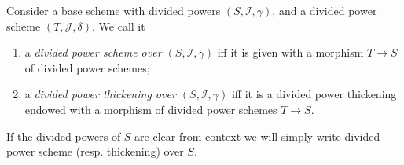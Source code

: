 \begin{defn}
	Consider a base scheme with divided powers
	$\left(S, \mathcal{I}, \gamma\right)$, and a divided power
	scheme $\left(T, \mathcal{J}, \delta\right)$.
	We call it 
\begin{enumerate}
	\item a \emph{divided power scheme over $\left(S, \mathcal{I}, \gamma\right)$}
		iff it is given with a morphism 
		$T \to S$
		of divided power schemes;

	\item a \emph{divided power thickening over $\left(S, \mathcal{I}, \gamma\right)$}
		iff it is a divided power thickening endowed
		with a morphism of divided power schemes $T \to S$.
\end{enumerate}
	If the divided powers of $S$ are clear from context we will
	simply write divided power scheme (resp$.$ thickening) over $S$.
\end{defn}


